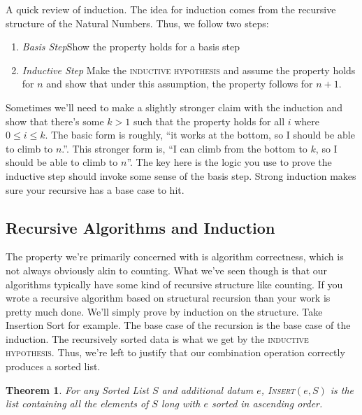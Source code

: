 \documentclass[]{tufte-handout}
\newtheorem{theorem}{Theorem}
\begin{document}
A quick review of induction.  The idea for induction comes from the recursive structure of the Natural Numbers. Thus, we follow two steps:
\begin{enumerate}
\item \textit{Basis Step}Show the property holds for a basis step
\item \textit{Inductive Step} Make the \textsc{inductive hypothesis} and assume the property holds for $n$ and show that under this assumption, the property follows for $n+1$. 
\end{enumerate}
Sometimes we'll need to make a slightly stronger claim with the induction and show that there's some $k>1$ such that the property holds for all $i$ where $0\leq i \leq k$.  The basic form is roughly, ``it works at the bottom, so I should be able to climb to $n$.''.  This stronger form is, ``I can climb from the bottom to $k$, so I should be able to climb to $n$''.  The key here is the logic you use to prove the inductive step should invoke some sense of the basis step. Strong induction makes sure your recursive has a base case to hit. 

\subsection{Recursive Algorithms and Induction}

The property we're primarily concerned with is algorithm correctness, which is not always obviously akin to counting.  What we've seen though is that our algorithms typically have some kind of recursive structure like counting. If you wrote a recursive algorithm based on structural recursion than your work is pretty much done. We'll simply prove by induction on the structure. Take Insertion Sort for example. The base case of the recursion is the base case of the induction. The recursively sorted data is what we get by the \textsc{inductive hypothesis}. Thus, we're left to justify that our combination operation correctly produces a sorted list.   

\begin{theorem}
For any Sorted List $S$ and additional datum $e$, \textsc{Insert}$(e,S)$ is the list containing all the elements of $S$ long with $e$ sorted in ascending order.
\label{th:Insert}
\end{theorem}
\end{document}
